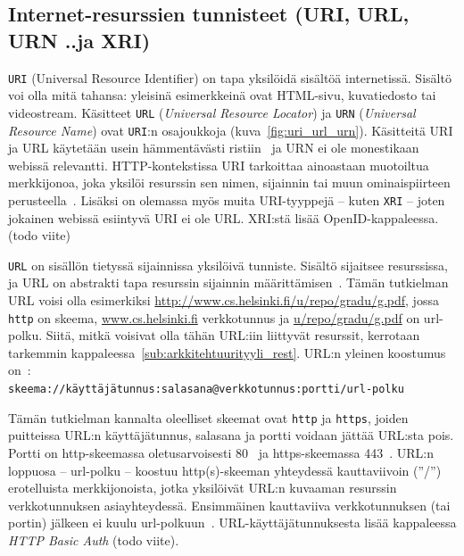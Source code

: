 \documentclass[finnish,gradu]{tktltiki}
\begin{document}
  \subsection{Internet-resurssien tunnisteet (URI, URL, URN ..ja XRI)} %
  \label{sub:käsitteet_uri_url_ja_urn}

  \verb!URI! (Universal Resource Identifier) on tapa yksilöidä sisältöä internetissä. Sisältö voi olla mitä tahansa: yleisinä esimerkkeinä ovat HTML-sivu, kuvatiedosto tai videostream. Käsitteet \verb!URL! (\emph{Universal Resource Locator}) ja \verb!URN! (\emph{Universal Resource Name}) ovat \verb!URI!:n osajoukkoja (kuva~\ref{fig:uri_url_urn}). Käsitteitä URI ja URL käytetään usein hämmentävästi ristiin~\cite{w3c_uri_clarifications} ja URN ei ole monestikaan webissä relevantti. HTTP-kontekstissa URI tarkoittaa ainoastaan muotoiltua merkkijonoa, joka yksilöi resurssin sen nimen, sijainnin tai muun ominaispiirteen perusteella~\cite{ietf_rfc_http1.1}. Lisäksi on olemassa myös muita URI-tyyppejä -- kuten \verb!XRI! -- joten jokainen webissä esiintyvä URI ei ole URL. XRI:stä lisää OpenID-kappaleessa. (todo viite)

  \verb!URL! on sisällön tietyssä sijainnissa yksilöivä tunniste. Sisältö sijaitsee resurssissa, ja URL on abstrakti tapa resurssin sijainnin määrittämisen~\cite{ietf_rfc_urls}. Tämän tutkielman URL voisi olla esimerkiksi \url{http://www.cs.helsinki.fi/u/repo/gradu/g.pdf}, jossa \verb!http! on skeema, \url{www.cs.helsinki.fi} verkkotunnus ja \url{u/repo/gradu/g.pdf} on url-polku. Siitä, mitkä voisivat olla tähän URL:iin liittyvät resurssit, kerrotaan tarkemmin kappaleessa~\ref{sub:arkkitehtuurityyli_rest}. URL:n yleinen koostumus on~\cite{ietf_rfc_urls}:
  \\ \verb!skeema://käyttäjätunnus:salasana@verkkotunnus:portti/url-polku!

  Tämän tutkielman kannalta oleelliset skeemat ovat \verb!http! ja \verb!https!, joiden puitteissa URL:n käyttäjätunnus, salasana ja portti voidaan jättää URL:sta pois. Portti on http-skeemassa oletusarvoisesti 80~\cite{ietf_rfc_urls} ja https-skeemassa 443~\cite{ietf_rfc_http_tls}. URL:n loppuosa -- url-polku -- koostuu http(s)-skeeman yhteydessä kauttaviivoin (''/'') erotelluista merkkijonoista, jotka yksilöivät URL:n kuvaaman resurssin verkkotunnuksen asiayhteydessä. Ensimmäinen kauttaviiva verkkotunnuksen (tai portin) jälkeen ei kuulu url-polkuun~\cite{ietf_rfc_urls}. URL-käyttäjätunnuksesta lisää kappaleessa \emph{HTTP Basic Auth} (todo viite).
\end{document}
